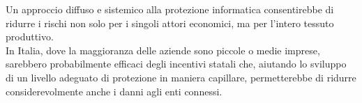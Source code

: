 \documentclass[12pt,a4paper,twoside]{report}
\begin{document}
Un approccio diffuso e sistemico alla protezione informatica consentirebbe di ridurre i rischi non 
solo per i singoli attori economici, ma per l'intero tessuto produttivo.\\
In Italia, dove la maggioranza delle aziende sono piccole o medie imprese, 
sarebbero probabilmente efficaci degli incentivi statali che, aiutando lo 
sviluppo di un livello adeguato di protezione in maniera capillare,
permetterebbe di ridurre considerevolmente anche i danni agli enti connessi.

\newpage



\label{Bibliography}


\end{document}
